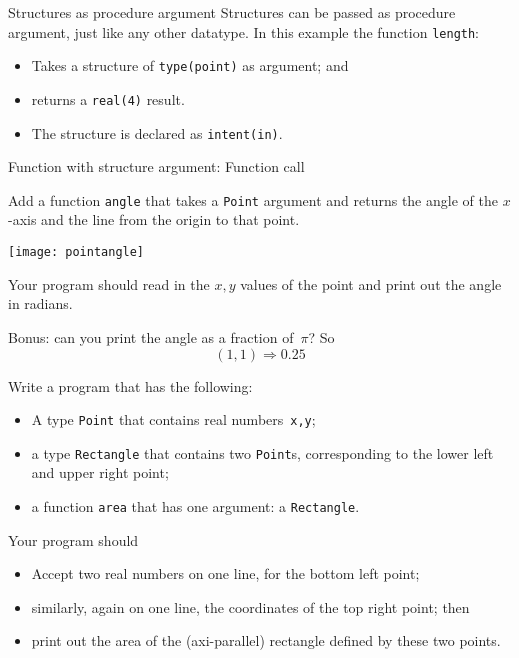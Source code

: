 \begin{block}{Structures as procedure argument}
  \label{sl:ftype-pass}
  Structures can be passed as procedure argument, just like any other
  datatype. In this example the function \lstinline{length}:
  \begin{itemize}
  \item Takes a structure of \lstinline{type(point)} as argument; and
  \item returns a \lstinline{real(4)} result.
  \item The structure is declared as \lstinline{intent(in)}.
  \end{itemize}

  \begin{multicols}{2}
    Function with structure argument:
    \columnbreak
    Function call
  \end{multicols}
\end{block}

\begin{exercise}
  \label{ex:ftype-angle}
  Add a function \lstinline{angle} that takes a \lstinline{Point}
  argument and returns the angle of the $x$-axis and the line
  from the origin to that point.

  \texttt{[image: pointangle]}

  Your program should read in the $x,y$ values of the point
  and print out the angle in radians.

  Bonus: can you print the angle
  as a fraction of~$\pi$? So
  \[ (1,1) \Rightarrow 0.25 \]
\end{exercise}

\begin{exercise}
  \label{ex:ftype-rect}
  Write a program that has the following:
  \begin{itemize}
  \item A type \lstinline{Point} that contains real numbers~\lstinline{x,y};
  \item a type \lstinline{Rectangle} that contains two \lstinline{Point}s,
    corresponding to the lower left and upper right point;
  \item a function \lstinline{area} that has one argument: a \lstinline{Rectangle}.
  \end{itemize}
  Your program should
  \begin{itemize}
  \item Accept two real numbers on one line, for the bottom left point;
  \item similarly, again on one line, the coordinates of the top right point; then
  \item print out the area of the (axi-parallel) rectangle defined by these two points.
  \end{itemize}
\end{exercise}

